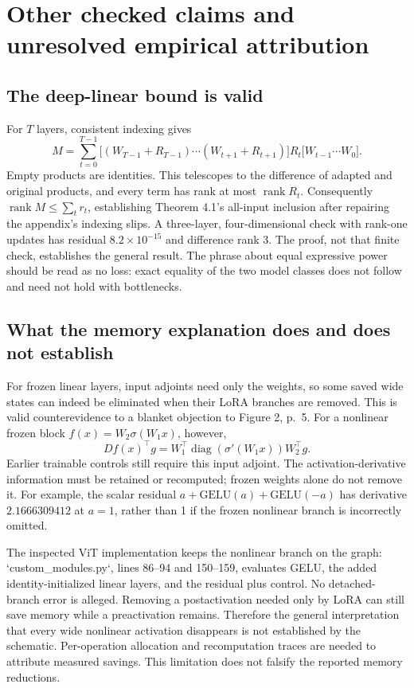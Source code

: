 \documentclass[10pt]{article}
\begin{document}
\section*{Other checked claims and unresolved empirical attribution}
\subsection*{The deep-linear bound is valid}
For \(T\) layers, consistent indexing gives \[M=\sum_{t=0}^{T-1}
\bigl[(W_{T-1}+R_{T-1})\cdots(W_{t+1}+R_{t+1})\bigr]
R_t\bigl[W_{t-1}\cdots W_0\bigr].\] Empty products are identities. This telescopes to the difference of adapted and original products, and every term has rank at most \(\operatorname{rank}R_t\). Consequently \(\operatorname{rank}M\le\sum_t r_t\), establishing Theorem 4.1’s all-input inclusion after repairing the appendix’s indexing slips. A three-layer, four-dimensional check with rank-one updates has residual \(8.2\times10^{-15}\) and difference rank 3. The proof, not that finite check, establishes the general result. The phrase about equal expressive power should be read as no loss: exact equality of the two model classes does not follow and need not hold with bottlenecks.\par
\subsection*{What the memory explanation does and does not establish}
For frozen linear layers, input adjoints need only the weights, so some saved wide states can indeed be eliminated when their LoRA branches are removed. This is valid counterevidence to a blanket objection to Figure 2, p. 5. For a nonlinear frozen block \(f(x)=W_2\sigma(W_1x)\), however, \[D f(x)^\top g=W_1^\top
\operatorname{diag}(\sigma'(W_1x))W_2^\top g.\] Earlier trainable controls still require this input adjoint. The activation-derivative information must be retained or recomputed; frozen weights alone do not remove it. For example, the scalar residual \(a+\mathrm{GELU}(a)+\mathrm{GELU}(-a)\) has derivative \(2.1666309412\) at \(a=1\), rather than 1 if the frozen nonlinear branch is incorrectly omitted.\par
The inspected ViT implementation keeps the nonlinear branch on the graph: `custom\_modules.py`, lines 86–94 and 150–159, evaluates GELU, the added identity-initialized linear layers, and the residual plus control. No detached-branch error is alleged. Removing a postactivation needed only by LoRA can still save memory while a preactivation remains. Therefore the general interpretation that every wide nonlinear activation disappears is not established by the schematic. Per-operation allocation and recomputation traces are needed to attribute measured savings. This limitation does not falsify the reported memory reductions.\par
\end{document}
